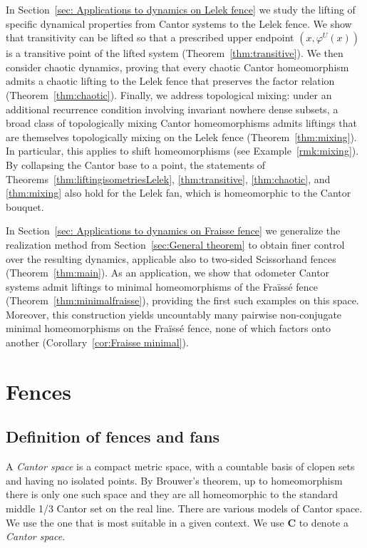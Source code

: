 \documentclass[11pt]{amsart}
\newcommand{\cantor}{\mathbf C}
\begin{document}
In Section~\ref{sec: Applications to dynamics on Lelek fence} we study the lifting of specific dynamical properties from Cantor systems to the Lelek fence. We show that transitivity can be lifted so that a prescribed upper endpoint $(x,\varphi^U(x))$ is a transitive point of the lifted system (Theorem~\ref{thm:transitive}). We then consider chaotic dynamics, proving that every chaotic Cantor homeomorphism admits a chaotic lifting to the Lelek fence that preserves the factor relation (Theorem~\ref{thm:chaotic}). Finally, we address topological mixing: under an additional recurrence condition involving invariant nowhere dense subsets, a broad class of topologically mixing Cantor homeomorphisms admits liftings that are themselves topologically mixing on the Lelek fence (Theorem~\ref{thm:mixing}). In particular, this applies to shift homeomorphisms (see Example~\ref{rmk:mixing}). By collapsing the Cantor base to a point, the statements of Theorems~\ref{thm:liftingisometriesLelek}, \ref{thm:transitive}, \ref{thm:chaotic}, and \ref{thm:mixing} also hold for the Lelek fan, which is homeomorphic to the Cantor bouquet.

In Section~\ref{sec: Applications to dynamics on Fraisse fence} we generalize the realization method from Section~\ref{sec:General theorem} to obtain finer control over the resulting dynamics, applicable also to two-sided Scissorhand fences (Theorem~\ref{thm:main}). As an application, we show that odometer Cantor systems admit liftings to minimal homeomorphisms of the Fra\"iss\'e fence (Theorem~\ref{thm:minimalfraisse}), providing the first such examples on this space. Moreover, this construction yields uncountably many pairwise non-conjugate minimal homeomorphisms on the Fra\"iss\'e fence, none of which factors onto another (Corollary~\ref{cor:Fraisse minimal}).


\section{Fences}
\subsection{Definition of fences and fans}
A \emph{Cantor space} is a compact metric space, with a countable basis of clopen sets and having no isolated points. By Brouwer's theorem, up to homeomorphism there is only one such space and they are all homeomorphic to the standard middle 1/3 Cantor set on the real line. There are various models of Cantor space. We use the one that is most suitable in a given context. We use $\cantor$ to denote a \emph{Cantor space}.
\end{document}
